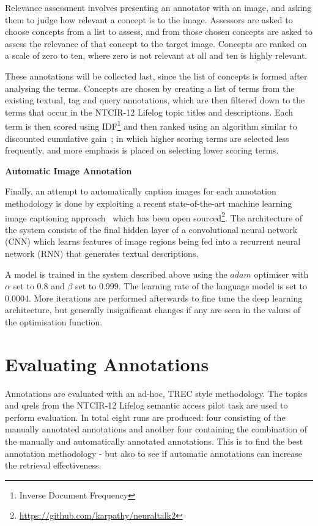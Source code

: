 Relevance assessment involves presenting an annotator with an image, and asking them to judge how relevant a concept is to the image. Assessors are asked to choose concepts from a list to assess, and from those chosen concepts are asked to assess the relevance of that concept to the target image. Concepts are ranked on a scale of zero to ten, where zero is not relevant at all and ten is highly relevant.

These annotations will be collected last, since the list of concepts is formed after analysing the terms. Concepts are chosen by creating a list of terms from the existing textual, tag and query annotations, which are then filtered down to the terms that occur in the NTCIR-12 Lifelog topic titles and descriptions. Each term is then scored using IDF\footnote{Inverse Document Frequency} and then ranked using an algorithm similar to discounted cumulative gain~\cite{jarvelin2002cumulated}; in which higher scoring terms are selected less frequently, and more emphasis is placed on selecting lower scoring terms. 

\newpage
\textbf{Automatic Image Annotation}

Finally, an attempt to automatically caption images for each annotation methodology is done by exploiting a recent state-of-the-art machine learning image captioning approach~\cite{karpathy2015deep} which has been open sourced\footnote{\url{https://github.com/karpathy/neuraltalk2}}. The architecture of the system consists of the final hidden layer of a convolutional neural network (CNN) which learns features of image regions being fed into a recurrent neural network (RNN) that generates textual descriptions.

A model is trained in the system described above using the $adam$ optimiser with $\alpha$ set to 0.8 and $\beta$ set to 0.999. The learning rate of the language model is set to 0.0004. More iterations are performed afterwards to fine tune the deep learning architecture, but generally insignificant changes if any are seen in the values of the optimisation function.



\section{Evaluating Annotations}

Annotations are evaluated with an ad-hoc, TREC style methodology. The topics and qrels from the NTCIR-12 Lifelog semantic access pilot task are used to perform evaluation. In total eight runs are produced: four consisting of the manually annotated annotations and another four containing the combination of the manually and automatically annotated annotations. This is to find the best annotation methodology - but also to see if automatic annotations can increase the retrieval effectiveness.

